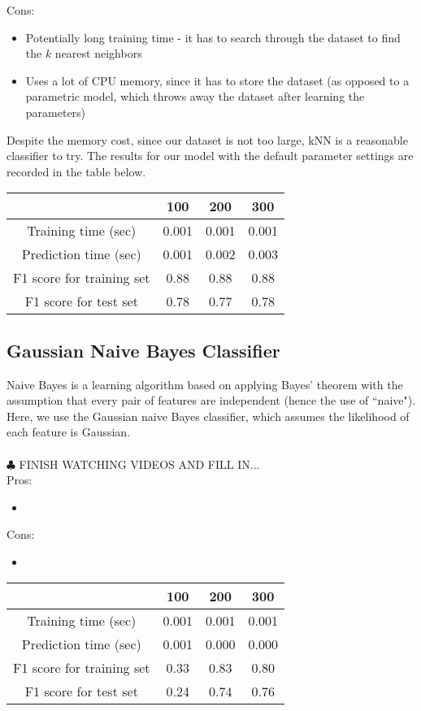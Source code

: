 \documentclass[12 pt]{article}
\numberwithin{equation}{section}
\begin{document}
Cons:
\begin{itemize}
	\item Potentially long training time - it has to search through the dataset to find the $k$ nearest neighbors
	\item Uses a lot of CPU memory, since it has to store the dataset (as opposed to a parametric model, which throws away the dataset after learning the parameters)
\end{itemize}

Despite the memory cost, since our dataset is not too large, kNN is a reasonable classifier to try. The results for our model with the default parameter settings are recorded in the table below.

\begin{center}
  \begin{tabular}{| c | c | c | c | }
    \hline
    & 100 & 200 & 300 \\ \hline
    Training time (sec) & 0.001 & 0.001 & 0.001 \\ \hline
    Prediction time (sec) & 0.001 & 0.002 & 0.003 \\ \hline 
    F1 score for training set & 0.88  & 0.88 & 0.88 \\ \hline
    F1 score for test set & 0.78 & 0.77 & 0.78 \\ \hline
  \end{tabular}
\end{center}

\subsection{Gaussian Naive Bayes Classifier}
Naive Bayes is a learning algorithm based on applying Bayes' theorem with the assumption that every pair of features are independent (hence the use of ``naive"). Here, we use the Gaussian naive Bayes classifier, which assumes the likelihood of each feature is Gaussian.\\
\\
$\clubsuit$ FINISH WATCHING VIDEOS AND FILL IN...\\
Pros:
\begin{itemize}
	\item 
\end{itemize}

Cons:
\begin{itemize}
	\item 
\end{itemize}

\begin{center}
  \begin{tabular}{| c | c | c | c | }
    \hline
    & 100 & 200 & 300 \\ \hline
    Training time (sec) & 0.001 & 0.001 & 0.001 \\ \hline
    Prediction time (sec) & 0.001 & 0.000 & 0.000 \\ \hline 
    F1 score for training set & 0.33 & 0.83 & 0.80 \\ \hline
    F1 score for test set & 0.24 & 0.74 & 0.76\\ \hline
  \end{tabular}
\end{center}
\end{document}
